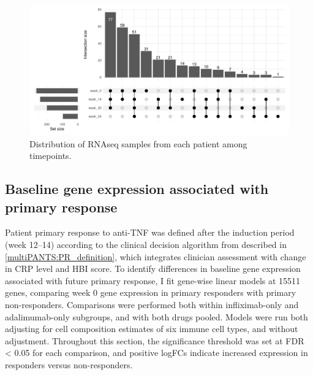 \begin{figure}
    \centering
    \includegraphics[width=1.0\textwidth,page=1]{mainmatter/figures/chapter_04/process_pheno.pheno_filtered_dge.Visit_Label_upset.pdf}
    \caption{Distribution of \gls{RNAseq} samples from each patient among timepoints.}
    \label{fig:multipants_visits_upset}
\end{figure}



\subsection{Baseline gene expression associated with primary response}


Patient primary response to anti-\gls{TNF} was defined after the induction period (week \numrange{12}{14}) according to the clinical decision algorithm from \textcite{kennedy2019PredictorsAntiTNFTreatment} described in \autoref{multiPANTS:PR_definition}, 
which integrates clinician assessment with change in \gls{CRP} level and \gls{HBI} score.
To identify differences in baseline gene expression associated with future primary response, 
I fit gene-wise linear models at 15511 genes, comparing week 0 gene expression in primary responders with primary non-responders.
Comparisons were performed both within infliximab-only and adalimumab-only subgroups, and with both drugs pooled.
Models were run both adjusting for cell composition estimates of six immune cell types, and without adjustment.
Throughout this section, the significance threshold was set at FDR < 0.05 for each comparison, and positive logFCs indicate increased expression in responders versus non-responders.

